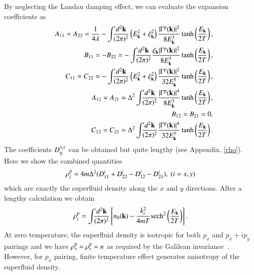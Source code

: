 \documentclass[aps,prd,amsmath,two column,nofootinbib,amssymb,referee]{revtex4}
\begin{document}
By neglecting the Landau damping effect, we can evaluate the expansion coefficients as
\begin{eqnarray}\label{ABCp}
&&A_{11}=A_{22}={1\over4\lambda}-\int\!\!\! {d^2{\bf k}\over(2\pi)^2}\left(E_{\bf k}^2+\xi_{\bf k}^2\right){|\Gamma^{\rm p}({\bf k})|^2\over8E_{\bf k}^3}\tanh\left({E_{\bf k}\over2T}\right),\nonumber\\
&&B_{11}=-B_{22}=-\int\!\!\! {d^2{\bf k}\over(2\pi)^2}{\xi_{\bf k}|\Gamma^{\rm p}({\bf k})|^2\over8E_{\bf k}^3}\tanh\left({E_{\bf k}\over2T}\right),\nonumber\\
&&C_{11}=C_{22}=-\int\!\!\! {d^2{\bf k}\over(2\pi)^2}\left(E_{\bf k}^2+\xi_{\bf k}^2\right){|\Gamma^{\rm p}({\bf k})|^2\over32E_{\bf k}^5}\tanh\left({E_{\bf k}\over2T}\right),\nonumber\\
&&A_{12}=A_{21}=\Delta^2\int\!\!\! {d^2{\bf k}\over(2\pi)^2}{|\Gamma^{\rm p}({\bf k})|^4\over8E_{\bf k}^3}\tanh\left({E_{\bf k}\over2T}\right),\nonumber\\
&&B_{12}=B_{21}=0,\nonumber\\
&&C_{12}=C_{21}=\Delta^2\int\!\!\! {d^2{\bf k}\over(2\pi)^2}{|\Gamma^{\rm p}({\bf k})|^4\over32E_{\bf k}^5}\tanh\left({E_{\bf k}\over2T}\right).
\end{eqnarray}
The coefficients $D_{\rm ij}^{x,y}$ can be obtained but quite lengthy (see Appendix. \ref{rho}). Here we show the combined quantities
\begin{eqnarray}
\rho_i^{\rm p}=4m\Delta^2(D_{11}^i+D_{22}^i-D_{12}^i-D_{21}^i), \ (i=x,y)
\end{eqnarray}
which are exactly the superfluid density along the $x$ and $y$ directions. After a lengthy calculation we obtain
\begin{eqnarray}\label{rhop}
\rho_i^{\rm p}=\int\!\!\! {d^2{\bf k}\over(2\pi)^2}\left[n_0({\bf k})-\frac{k_i^2}{4mT}{\rm sech}^2\left({E_{\bf k}\over2T}\right)\right].
\end{eqnarray}
At zero temperature, the superfluid density is isotropic for both $p_x$ and $p_x+ip_y$ pairings and we have $\rho_x^{\rm p}=\rho_y^{\rm p}=n$ as required by the Galilean invariance~\cite{Leggett2006}. However, for $p_x$ pairing, finite temperature effect generates anisotropy of the superfluid density.  
\end{document}
